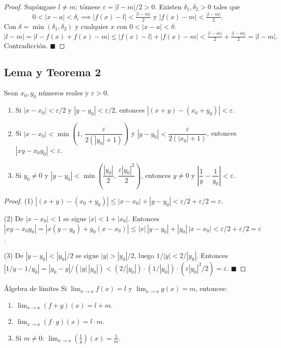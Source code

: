 \documentclass[12pt]{article}
\begin{document}
\begin{proof}
Supóngase $l \neq m$; tómese $\varepsilon = |l - m|/2 > 0$. Existen $\delta_1, \delta_2 > 0$ tales que
\[ 0 < |x-a| < \delta_i \implies |f(x) - l| < \tfrac{|l-m|}{2} \text{ y } |f(x) - m| < \tfrac{|l-m|}{2}. \]
Con $\delta = \min(\delta_1, \delta_2)$ y cualquier $x$ con $0 < |x-a| < \delta$:
\[ |l - m| = |l - f(x) + f(x) - m| \leq |f(x) - l| + |f(x) - m| < \tfrac{|l-m|}{2} + \tfrac{|l-m|}{2} = |l-m|. \]
Contradicción.
$\blacksquare$
\end{proof}

\subsection{Lema y Teorema 2}

\begin{lema}[]{}
Sean $x_0, y_0$ números reales y $\varepsilon > 0$.
\begin{enumerate}
  \item[(1)] Si $|x - x_0| < \varepsilon/2$ y $|y - y_0| < \varepsilon/2$, entonces $|(x+y)-(x_0+y_0)| < \varepsilon$.
  \item[(2)] Si $|x - x_0| < \min\!\left(1,\, \dfrac{\varepsilon}{2(|y_0|+1)}\right)$ y $|y - y_0| < \dfrac{\varepsilon}{2(|x_0|+1)}$, entonces $|xy - x_0 y_0| < \varepsilon$.
  \item[(3)] Si $y_0 \neq 0$ y $|y - y_0| < \min\!\left(\dfrac{|y_0|}{2},\, \dfrac{\varepsilon |y_0|^2}{2}\right)$, entonces $y \neq 0$ y $\left|\dfrac{1}{y} - \dfrac{1}{y_0}\right| < \varepsilon$.
\end{enumerate}
\end{lema}

\begin{proof}
(1) $|(x+y)-(x_0+y_0)| \leq |x-x_0|+|y-y_0| < \varepsilon/2+\varepsilon/2 = \varepsilon$.

(2) De $|x-x_0|<1$ se sigue $|x|<1+|x_0|$. Entonces
$|xy-x_0y_0| = |x(y-y_0)+y_0(x-x_0)| \leq |x|\,|y-y_0|+|y_0|\,|x-x_0| < \varepsilon/2+\varepsilon/2 = \varepsilon$.

(3) De $|y-y_0|<|y_0|/2$ se sigue $|y|>|y_0|/2$, luego $1/|y|<2/|y_0|$. Entonces
$|1/y-1/y_0| = |y_0-y|/(|y|\,|y_0|) < (2/|y_0|)\cdot(1/|y_0|)\cdot(\varepsilon|y_0|^2/2) = \varepsilon$.
$\blacksquare$
\end{proof}

\begin{teorema}[2]{Álgebra de límites}
Si $\displaystyle\lim_{x \to a} f(x) = l$ y $\displaystyle\lim_{x \to a} g(x) = m$, entonces:
\begin{enumerate}
  \item[(1)] $\displaystyle\lim_{x \to a}(f + g)(x) = l + m$.
  \item[(2)] $\displaystyle\lim_{x \to a}(f \cdot g)(x) = l \cdot m$.
  \item[(3)] Si $m \neq 0$: $\displaystyle\lim_{x \to a}\!\left(\frac{1}{g}\right)\!(x) = \frac{1}{m}$.
\end{enumerate}
\end{teorema}
\end{document}
